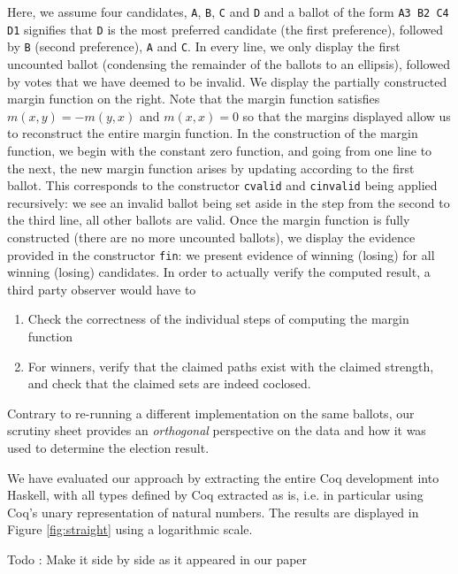 \noindent
Here, we assume four candidates, \texttt{A}, \texttt{B}, \texttt{C}
and \texttt{D} and a ballot of the form \texttt{A3  B2  C4  D1}
signifies that \texttt{D} is the most preferred candidate (the first
preference), followed by \texttt{B} (second preference), \texttt{A}
and \texttt{C}. In every line, we only display the first uncounted
ballot (condensing the remainder of the ballots to an ellipsis),
followed by votes that we have deemed to be invalid. We display the
partially constructed margin function on the right. Note that the
margin function satisfies  $m(x, y) = -m(y, x)$ and $m(x, x) = 0$ so
that the margins displayed allow us to reconstruct the entire margin
function. In the construction of the margin function, we begin with
the constant zero function, and going from one line to the next, the
new margin function arises by updating according to the first
ballot. This corresponds to the constructor \texttt{cvalid} and
\texttt{cinvalid} being
applied recursively: we see an invalid ballot being set aside in the
step from the second to the third line, all other ballots are valid.
Once the margin function is fully constructed (there are no
more uncounted ballots), we display the evidence provided in the
constructor \texttt{fin}: we present evidence of winning (losing) for
all winning (losing) candidates. 
%
In order to actually verify the computed result, a third party
observer would have to
\begin{enumerate}
\item Check the correctness of the individual steps of computing the
margin function
\item For winners, verify that the claimed paths exist with the
claimed strength, and check that the claimed sets are indeed
coclosed.
\end{enumerate}

\noindent
Contrary to re-running a different implementation on the same
ballots, our scrutiny sheet provides an \emph{orthogonal}
perspective on the data and how it was used to determine the
election result.

We have evaluated our approach by extracting the entire Coq
development into Haskell, with all types defined by Coq extracted as
is, i.e. in particular using Coq's unary representation of natural
numbers. The results are displayed in Figure \ref{fig:straight}
using a logarithmic scale. 

Todo : Make it side by side as it appeared in our paper

